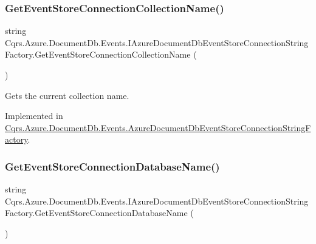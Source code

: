 \subsubsection{\texorpdfstring{Get\+Event\+Store\+Connection\+Collection\+Name()}{GetEventStoreConnectionCollectionName()}}
{\footnotesize\ttfamily string Cqrs.\+Azure.\+Document\+Db.\+Events.\+I\+Azure\+Document\+Db\+Event\+Store\+Connection\+String\+Factory.\+Get\+Event\+Store\+Connection\+Collection\+Name (\begin{DoxyParamCaption}{ }\end{DoxyParamCaption})}



Gets the current collection name. 



Implemented in \hyperlink{classCqrs_1_1Azure_1_1DocumentDb_1_1Events_1_1AzureDocumentDbEventStoreConnectionStringFactory_a47a2b2315a2ca8daa9355530a241c133_a47a2b2315a2ca8daa9355530a241c133}{Cqrs.\+Azure.\+Document\+Db.\+Events.\+Azure\+Document\+Db\+Event\+Store\+Connection\+String\+Factory}.

\mbox{\label{interfaceCqrs_1_1Azure_1_1DocumentDb_1_1Events_1_1IAzureDocumentDbEventStoreConnectionStringFactory_a826c95e8dab31be9ef97cf3bea92d95d_a826c95e8dab31be9ef97cf3bea92d95d}} 
\subsubsection{\texorpdfstring{Get\+Event\+Store\+Connection\+Database\+Name()}{GetEventStoreConnectionDatabaseName()}}
{\footnotesize\ttfamily string Cqrs.\+Azure.\+Document\+Db.\+Events.\+I\+Azure\+Document\+Db\+Event\+Store\+Connection\+String\+Factory.\+Get\+Event\+Store\+Connection\+Database\+Name (\begin{DoxyParamCaption}{ }\end{DoxyParamCaption})}



